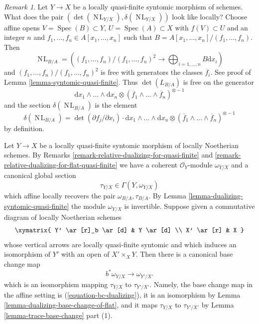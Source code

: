\documentclass[10pt,a4paper]{amsart}
\theoremstyle{plain}
\theoremstyle{definition}
\theoremstyle{remark}
\newtheorem{remark}[subsection]{Remark}
\numberwithin{equation}{subsection}
\def\Spec{\mathop{\mathrm{Spec}}}
\def\NL{\mathop{N\!L}\nolimits}
\begin{document}
\begin{remark}
\label{remark-local-description-delta}
Let $Y \to X$ be a locally quasi-finite syntomic morphism of schemes.
What does the pair $(\det(\NL_{Y/X}), \delta(\NL_{Y/X}))$ look
like locally? Choose affine opens $V = \Spec(B) \subset Y$,
$U = \Spec(A) \subset X$ with $f(V) \subset U$ and an integer $n$ and
$f_1, \ldots, f_n \in A[x_1, \ldots, x_n]$ such that
$B = A[x_1, \ldots, x_n]/(f_1, \ldots, f_n)$. Then
$$
\NL_{B/A} = \left(
(f_1, \ldots, f_n)/(f_1, \ldots, f_n)^2
\longrightarrow
\bigoplus\nolimits_{i = 1, \ldots, n} B \text{d} x_i\right)
$$
and $(f_1, \ldots, f_n)/(f_1, \ldots, f_n)^2$ is free with generators
the classes $\overline{f}_i$. See proof of
Lemma \ref{lemma-syntomic-quasi-finite}.
Thus $\det(L_{B/A})$ is free on the generator
$$
\text{d}x_1 \wedge \ldots \wedge \text{d}x_n
\otimes
(\overline{f}_1 \wedge \ldots \wedge \overline{f}_n)^{\otimes -1}
$$
and the section $\delta(\NL_{B/A})$ is the element
$$
\delta(\NL_{B/A}) =
\det(\partial f_j/ \partial x_i) \cdot
\text{d}x_1 \wedge \ldots \wedge \text{d}x_n
\otimes
(\overline{f}_1 \wedge \ldots \wedge \overline{f}_n)^{\otimes -1}
$$
by definition.
\end{remark}

\noindent
Let $Y \to X$ be a locally quasi-finite syntomic morphism of
locally Noetherian schemes. By
Remarks \ref{remark-relative-dualizing-for-quasi-finite} and
\ref{remark-relative-dualizing-for-flat-quasi-finite} we have
a coherent $\mathcal{O}_Y$-module $\omega_{Y/X}$ and a canonical
global section
$$
\tau_{Y/X} \in \Gamma(Y, \omega_{Y/X})
$$
which affine locally recovers the pair $\omega_{B/A}, \tau_{B/A}$.
By Lemma \ref{lemma-dualizing-syntomic-quasi-finite} the module
$\omega_{Y/X}$ is invertible. Suppose given a commutative diagram of
locally Noetherian schemes
$$
\xymatrix{
Y' \ar[r]_b \ar[d] & Y \ar[d] \\
X' \ar[r] & X
}
$$
whose vertical arrows are locally quasi-finite syntomic and which
induces an isomorphism of $Y'$ with an open of $X' \times_X Y$.
Then there is a canonical base change map
$$
b^*\omega_{Y/X} \longrightarrow \omega_{Y'/X'}
$$
which is an isomorphism
mapping $\tau_{Y/X}$ to $\tau_{Y'/X'}$. Namely, the base change map
in the affine setting is (\ref{equation-bc-dualizing}), it is an
isomorphism by Lemma \ref{lemma-dualizing-base-change-of-flat}, and it
maps $\tau_{Y/X}$ to $\tau_{Y'/X'}$ by
Lemma \ref{lemma-trace-base-change} part (1).
\end{document}
